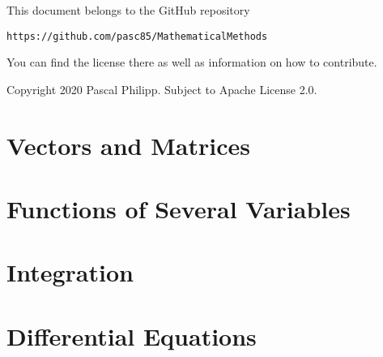 \documentclass[12pt,a4paper]{report}
\theoremstyle{definition}
\begin{document}
\bigskip
This document belongs to the GitHub repository
\begin{center}
\texttt{https://github.com/pasc85/MathematicalMethods}
\end{center}
You can find the license there as well as information on how to contribute.

\vfill
\noindent
Copyright 2020 Pascal Philipp. Subject to Apache License 2.0.

\thispagestyle{empty}
\newpage
\restoregeometry

\tableofcontents
\thispagestyle{empty}
\newpage
\listoftheorems[ignoreall,show={application}]
\thispagestyle{empty}
\restoregeometry


\chapter{Vectors and Matrices}
\label{ch:vm}


\chapter{Functions of Several Variables}
\label{ch:fsv}


\chapter{Integration}
\label{ch:i}


\chapter{Differential Equations}
\label{ch:de}


\printendnotes
\end{document}
